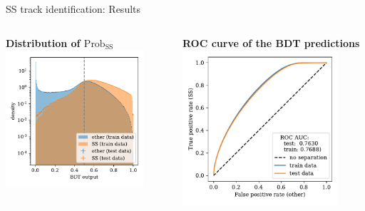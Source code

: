 \documentclass[aspectratio=1610, 10pt]{beamer}
\begin{document}
\begin{frame}{SS track identification: Results}
  \begin{columns}
    \begin{column}{0.5\textwidth}
      \centering
      \textbf{Distribution of $\text{Prob}_\text{SS}$}
      \includegraphics[width=0.85\textwidth]{images/SS_output.pdf}
    \end{column}
    \begin{column}{0.5\textwidth}
      \centering
      \textbf{ROC curve of the BDT predictions}
      \includegraphics[width=0.85\textwidth]{images/SS_ROC.pdf}
    \end{column}
  \end{columns}
\end{frame}
\end{document}
